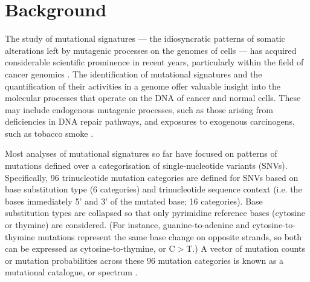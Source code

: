 \section*{Background}
The study of mutational signatures — the idiosyncratic patterns of somatic alterations left by mutagenic processes on the genomes of cells — has acquired considerable scientific prominence in recent years, particularly within the field of cancer genomics \cite{Alexandrov2014, Petljak2016}. The identification of mutational signatures and the quantification of their activities in a genome offer valuable insight into the molecular processes that operate on the DNA of cancer and normal cells. These may include endogenous mutagenic processes, such as those arising from deficiencies in DNA repair pathways, and exposures to exogenous carcinogens, such as tobacco smoke \cite{Petljak2016}.

Most analyses of mutational signatures so far have focused on patterns of mutations defined over a categorisation of single-nucleotide variants (SNVs). Specifically, 96 trinucleotide mutation categories are defined for SNVs based on base substitution type (6 categories) and trinucleotide sequence context (i.e. the bases immediately 5' and 3' of the mutated base; 16 categories). Base substitution types are collapsed so that only pyrimidine reference bases (cytosine or thymine) are considered. (For instance, guanine-to-adenine and cytosine-to-thymine mutations represent the same base change on opposite strands, so both can be expressed as cytosine-to-thymine, or C$>$T.) A vector of mutation counts or mutation probabilities across these 96 mutation categories is known as a mutational catalogue, or spectrum \cite{Alexandrov2014, Alexandrov2013}.

